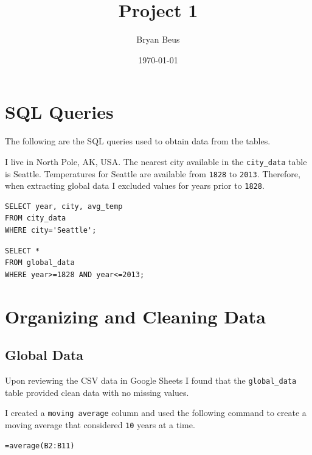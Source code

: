 \documentclass[12pt]{article}
\title{\bfseries Project 1}
\author{Bryan Beus}
\date{\today}
\begin{document}
\maketitle


\section{SQL Queries}

The following are the SQL queries used to obtain data from the tables.

I live in North Pole, AK, USA. The nearest city available in the \lstinline{city_data} table is Seattle. Temperatures for Seattle are available from \lstinline{1828} to \lstinline{2013}. Therefore, when extracting global data I excluded values for years prior to \lstinline{1828}.

\begin{verbatim}
SELECT year, city, avg_temp
FROM city_data
WHERE city='Seattle';
\end{verbatim}

\begin{verbatim}
SELECT *
FROM global_data
WHERE year>=1828 AND year<=2013;
\end{verbatim}

\pagebreak

\section{Organizing and Cleaning Data}

\subsection{Global Data}

Upon reviewing the CSV data in Google Sheets I found that the \lstinline{global_data} table provided clean data with no missing values.

I created a \lstinline{moving average} column and used the following command to create a moving average that considered \lstinline{10} years at a time.

\begin{verbatim}
=average(B2:B11)
\end{verbatim}
\end{document}
